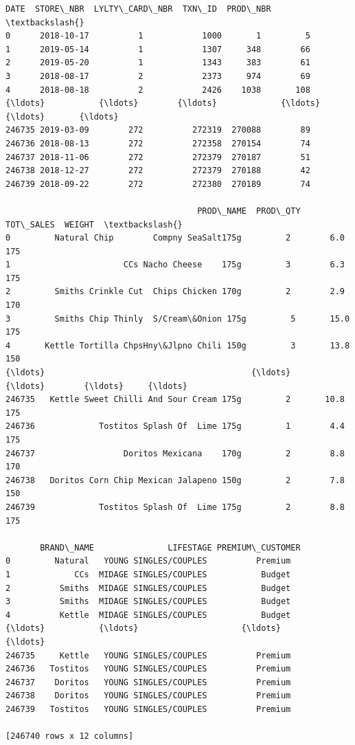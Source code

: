 \documentclass[11pt]{article}
\makeatletter
\newcommand{\boxspacing}{\kern\kvtcb@left@rule\kern\kvtcb@boxsep}
\newcommand{\prompt}[4]{
        {\ttfamily\llap{{\color{#2}[#3]:\hspace{3pt}#4}}\vspace{-\baselineskip}}
    }
\makeatother
\begin{document}
            \begin{tcolorbox}[breakable, size=fbox, boxrule=.5pt, pad at break*=1mm, opacityfill=0]
\prompt{Out}{outcolor}{237}{\boxspacing}
\begin{Verbatim}[commandchars=\\\{\}]
             DATE  STORE\_NBR  LYLTY\_CARD\_NBR  TXN\_ID  PROD\_NBR  \textbackslash{}
0      2018-10-17          1            1000       1         5
1      2019-05-14          1            1307     348        66
2      2019-05-20          1            1343     383        61
3      2018-08-17          2            2373     974        69
4      2018-08-18          2            2426    1038       108
{\ldots}           {\ldots}        {\ldots}             {\ldots}     {\ldots}       {\ldots}
246735 2019-03-09        272          272319  270088        89
246736 2018-08-13        272          272358  270154        74
246737 2018-11-06        272          272379  270187        51
246738 2018-12-27        272          272379  270188        42
246739 2018-09-22        272          272380  270189        74

                                       PROD\_NAME  PROD\_QTY  TOT\_SALES  WEIGHT  \textbackslash{}
0         Natural Chip        Compny SeaSalt175g         2        6.0     175
1                       CCs Nacho Cheese    175g         3        6.3     175
2         Smiths Crinkle Cut  Chips Chicken 170g         2        2.9     170
3         Smiths Chip Thinly  S/Cream\&Onion 175g         5       15.0     175
4       Kettle Tortilla ChpsHny\&Jlpno Chili 150g         3       13.8     150
{\ldots}                                          {\ldots}       {\ldots}        {\ldots}     {\ldots}
246735   Kettle Sweet Chilli And Sour Cream 175g         2       10.8     175
246736             Tostitos Splash Of  Lime 175g         1        4.4     175
246737                  Doritos Mexicana    170g         2        8.8     170
246738   Doritos Corn Chip Mexican Jalapeno 150g         2        7.8     150
246739             Tostitos Splash Of  Lime 175g         2        8.8     175

       BRAND\_NAME               LIFESTAGE PREMIUM\_CUSTOMER
0         Natural   YOUNG SINGLES/COUPLES          Premium
1             CCs  MIDAGE SINGLES/COUPLES           Budget
2          Smiths  MIDAGE SINGLES/COUPLES           Budget
3          Smiths  MIDAGE SINGLES/COUPLES           Budget
4          Kettle  MIDAGE SINGLES/COUPLES           Budget
{\ldots}           {\ldots}                     {\ldots}              {\ldots}
246735     Kettle   YOUNG SINGLES/COUPLES          Premium
246736   Tostitos   YOUNG SINGLES/COUPLES          Premium
246737    Doritos   YOUNG SINGLES/COUPLES          Premium
246738    Doritos   YOUNG SINGLES/COUPLES          Premium
246739   Tostitos   YOUNG SINGLES/COUPLES          Premium

[246740 rows x 12 columns]
\end{Verbatim}
\end{tcolorbox}
        
\end{document}
